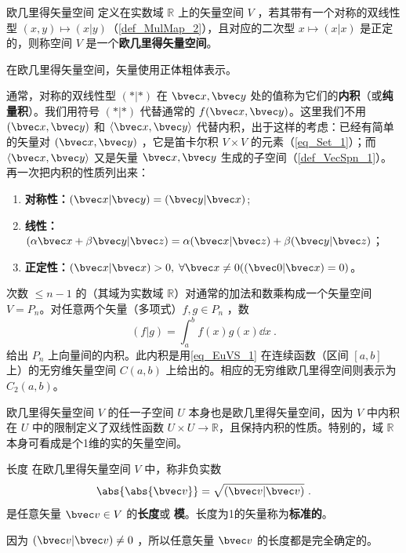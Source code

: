

\begin{definition}{欧几里得矢量空间}\label{def_EuVS_1}
定义在实数域 $\mathbb R$ 上的矢量空间 $V$ ，若其带有一个对称的双线性型 $( x, y)\mapsto( x| y)$（\autoref{def_MulMap_2}），且对应的二次型 $ x\mapsto( x| x)$ 是正定的，则称空间 $V$ 是一个\textbf{欧几里得矢量空间}。
\end{definition}

在欧几里得矢量空间，矢量使用正体粗体表示。

通常，对称的双线性型 $(*|*)$ 在 $\bvec x,\bvec y$ 处的值称为它们的\textbf{内积}（或\textbf{纯量积}）。我们用符号 $(*|*)$ 代替通常的 $f(\bvec x,\bvec y)$。这里我们不用 $(\bvec x,\bvec y)$ 和 $\langle\bvec x,\bvec y\rangle$ 代替内积，出于这样的考虑：已经有简单的矢量对 $(\bvec x,\bvec y)$ ，它是笛卡尔积 $V\times V$ 的元素（\autoref{eq_Set_1}）；而 $\langle \bvec x,\bvec y\rangle $ 又是矢量 $\bvec x,\bvec y$ 生成的子空间（\autoref{def_VecSpn_1}）。
再一次把内积的性质列出来：
\begin{enumerate}
\item \textbf{对称性：}$(\bvec x|\bvec y)=(\bvec y|\bvec x)$;
\item \textbf{线性：}$(\alpha\bvec x+\beta\bvec y|\bvec z)=\alpha(\bvec x|\bvec z)+\beta(\bvec y|\bvec z)$；
\item \textbf{正定性：}$(\bvec x|\bvec x)>0,\;\forall\bvec x\neq0((\bvec 0|\bvec x)=0)$。
\end{enumerate}
\begin{example}{}\label{ex_EuVS_1}
次数 $\leq n-1$ 的（其域为实数域 $\mathbb R$）对通常的加法和数乘构成一个矢量空间 $V=P_n$。对任意两个矢量（多项式）$f,g\in P_n$ ，数 
\begin{equation}\label{eq_EuVS_1}
(f|g)=\int_a^b f(x)g(x)\dd x~.
\end{equation}
给出 $P_n$ 上向量间的内积。此内积是用\autoref{eq_EuVS_1} 在连续函数（区间 $[a,b]$ 上）的无穷维矢量空间 $C(a,b)$ 上给出的。相应的无穷维欧几里得空间则表示为 $C_2(a,b)$。
\end{example}
\begin{example}{}
欧几里得矢量空间 $V$ 的任一子空间 $U$ 本身也是欧几里得矢量空间，因为 $V$ 中内积在 $U$ 中的限制定义了双线性函数 $U\times U\rightarrow\mathbb R$，且保持内积的性质。特别的，域 $\mathbb R$ 本身可看成是个1维的实的矢量空间。
\end{example}
\begin{definition}{长度}\label{def_EuVS_2}
在欧几里得矢量空间 $V$ 中，称非负实数
\begin{equation}
\abs{\abs{\bvec v}}=\sqrt{(\bvec v|\bvec v)}~.
\end{equation}
是任意矢量 $\bvec v\in V$ 的\textbf{长度}或 \textbf{模}。长度为1的矢量称为\textbf{标准的}。
\end{definition}
因为 $(\bvec v|\bvec v)\neq0$ ，所以任意矢量 $\bvec v$ 的长度都是完全确定的。

